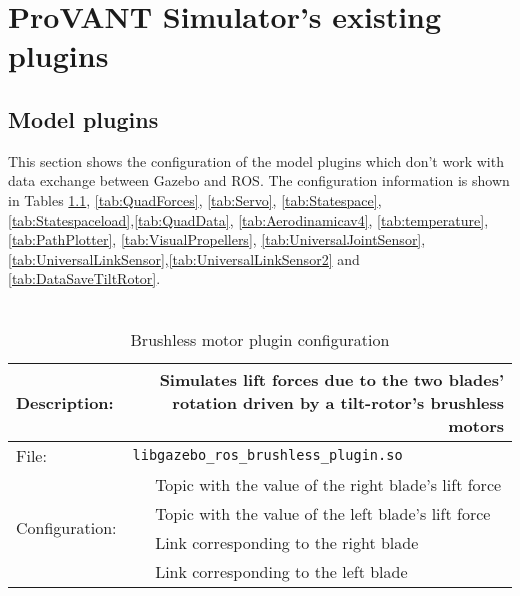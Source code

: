\chapter{ProVANT Simulator's existing plugins}
\label{pluginsAp}

\section{Model plugins}

This section shows the configuration of the model plugins which don't work with data exchange between Gazebo and ROS. The configuration information is shown in Tables \ref{tab:Brushless}, \ref{tab:QuadForces}, \ref{tab:Servo}, \ref{tab:Statespace}, \ref{tab:Statespaceload},\ref{tab:QuadData}, \ref{tab:Aerodinamicav4}, \ref{tab:temperature}, \ref{tab:PathPlotter}, \ref{tab:VisualPropellers}, \ref{tab:UniversalJointSensor}, \ref{tab:UniversalLinkSensor},\ref{tab:UniversalLinkSensor2} and \ref{tab:DataSaveTiltRotor}.


\newenvironment{plugintable}[5]{
	\newcommand \field[2] {& \xmltag{##1} & ##2 \\}
	\begin{table}[H]
		\centering
		\caption{\\#4}
		\label{#5}
		\begin{tabular}{|l|r|l|}
			\hline
			Description: & \multicolumn{2}{m{0.7\textwidth}|}{#1} \\ \hline
			File: & \multicolumn{2}{l|}{\texttt{#2}} \\ \hline
			\multirow{#3}{*}{Configuration:}	%
}{
			\hline
		\end{tabular}
	\end{table}
}

\begin{plugintable}
	{Simulates lift forces due to the two blades' rotation driven by a tilt-rotor's brushless motors}
	{libgazebo\_ros\_brushless\_plugin.so}
	{4}
	{Brushless motor plugin configuration}
	{tab:Brushless}
	\field{topic\_FR}{Topic with the value of the right blade's lift force}
	\field{topic\_FL}{Topic with the value of the left blade's lift force}
	\field{LinkDir}{Link corresponding to the right blade}
	\field{LinkEsq}{Link corresponding to the left blade}
\end{plugintable}

